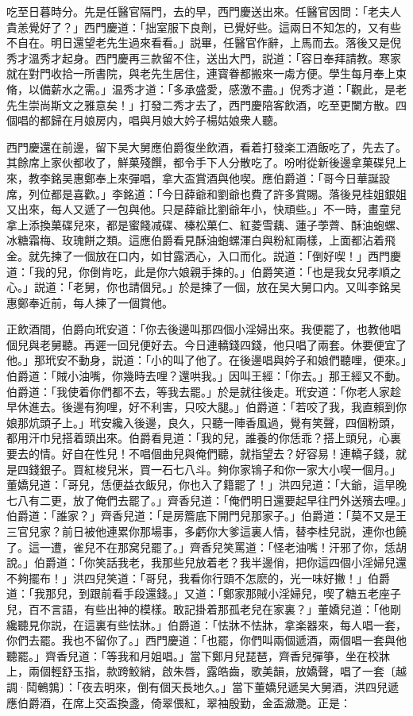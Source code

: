 吃至日暮時分。先是任醫官隔門，去的早，西門慶送出來。任醫官因問：「老夫人貴恙覺好了？」西門慶道：「拙室服下良劑，已覺好些。這兩日不知怎的，又有些不自在。明日還望老先生過來看看。」説畢，任醫官作辭，上馬而去。落後又是倪秀才溫秀才起身。西門慶再三款留不住，送出大門，説道：「容日奉拜請教。寒家就在對門收拾一所書院，與老先生居住，連寳眷都搬來一䖏方便。學生每月奉上束脩，以備薪水之需。」温秀才道：「多承盛愛，感激不盡。」倪秀才道：「觀此，是老先生崇尚斯文之雅意矣！」打發二秀才去了，西門慶陪客飲酒，吃至更闌方散。四個唱的都歸在月娘房内，唱與月娘大妗子楊姑娘衆人聽。

西門慶還在前邊，留下吴大舅應伯爵復坐飲酒，看着打發楽工酒飯吃了，先去了。其餘席上家伙都收了，鮮菓殘饌，都令手下人分散吃了。吩咐從新後邊拿菓碟兒上來，教李銘吴惠鄭奉上來彈唱，拿大盃賞酒與他喫。應伯爵道：「哥今日華誕設席，列位都是喜歡。」李銘道：「今日薛爺和劉爺也費了許多賞賜。落後見桂姐銀姐又出來，每人又遞了一包與他。只是薛爺比劉爺年小，快頑些。」不一時，畫童兒拿上添換菓碟兒來，都是蜜餞减碟、榛松菓仁、紅菱雪藕、蓮子荸薺、酥油蚫螺、冰糖霜梅、玫瑰餅之類。這應伯爵看見酥油蚫螺渾白與粉紅兩樣，上面都沾着飛金。就先揀了一個放在口内，如甘露洒心，入口而化。説道：「倒好喫！」西門慶道：「我的兒，你倒肯吃，此是你六娘親手揀的。」伯爵笑道：「也是我女兒孝順之心。」説道：「老舅，你也請個兒。」於是揀了一個，放在吴大舅口内。又叫李銘吴惠鄭奉近前，每人揀了一個賞他。

正飲酒間，伯爵向玳安道：「你去後邊叫那四個小淫婦出來。我便罷了，也教他唱個兒與老舅聽。再遲一回兒便好去。今日連轎錢四錢，他只唱了兩套。休要便宜了他。」那玳安不動身，説道：「小的叫了他了。在後邊唱與妗子和娘們聽哩，便來。」伯爵道：「賊小油嘴，你幾時去哩？還哄我。」因叫王經：「你去。」那王經又不動。伯爵道：「我使着你們都不去，等我去罷。」於是就往後走。玳安道：「你老人家趁早休進去。後邊有狗哩，好不利害，只咬大腿。」伯爵道：「若咬了我，我直賴到你娘那炕頭子上。」玳安纔入後邊，良久，只聽一陣香風過，覺有笑聲，四個粉頭，都用汗巾兒搭着頭出來。伯爵看見道：「我的兒，誰養的你恁乖？搭上頭兒，心裏要去的情。好自在性兒！不唱個曲兒與俺們聽，就指望去？好容易！連轎子錢，就是四錢銀子。買紅梭兒米，買一石七八斗。夠你家鴇子和你一家大小喫一個月。」董嬌兒道：「哥兒，恁便益衣飯兒，你也入了籍罷了！」洪四兒道：「大爺，這早晚七八有二更，放了俺們去罷了。」齊香兒道：「俺們明日還要起早往門外送殯去哩。」伯爵道：「誰家？」齊香兒道：「是房簷底下開門兒那家子。」伯爵道：「莫不又是王三官兒家？前日被他連累你那場事，多虧你大爹這裏人情，替李桂兒説，連你也饒了。這一遭，雀兒不在那窝兒罷了。」齊香兒笑罵道：「怪老油嘴！汗邪了你，恁胡說。」伯爵道：「你笑話我老，我那些兒放着老？我半邊俏，把你這四個小淫婦兒還不夠擺布！」洪四兒笑道：「哥兒，我看你行頭不怎麽的，光一味好撇！」伯爵道：「我那兒，到跟前看手段還錢。」又道：「鄭家那賊小淫婦兒，喫了糖五老座子兒，百不言語，有些出神的模樣。敢記掛着那孤老兒在家裏？」董嬌兒道：「他剛纔聽見你説，在這裏有些怯牀。」伯爵道：「怯牀不怯牀，拿楽器來，每人唱一套，你們去罷。我也不留你了。」西門慶道：「也罷，你們叫兩個遞酒，兩個唱一套與他聽罷。」齊香兒道：「等我和月姐唱。」當下鄭月兒琵琶，齊香兒彈箏，坐在校牀上，兩個輕舒玉指，款跨鮫綃，啟朱唇，露皓齒，歌美韻，放嬌聲，唱了一套〔越調·鬦鵪鶉〕：「夜去明來，倒有個天長地久。」當下董嬌兒遞吴大舅酒，洪四兒遞應伯爵酒，在席上交盃換盞，倚翠偎紅，翠袖殷勤，金盃瀲灧。正是：

